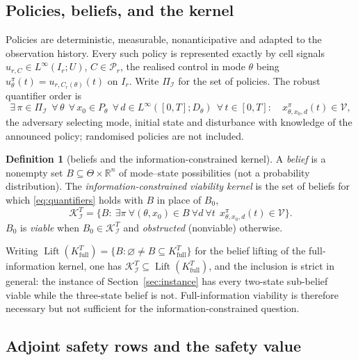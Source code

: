 \documentclass[11pt,a4paper]{article}
\theoremstyle{plain}
\theoremstyle{definition}
\newtheorem{definition}[theorem]{Definition}
\theoremstyle{remark}
\newcommand{\R}{\mathbb{R}}
\newcommand{\calI}{\mathcal{I}}
\newcommand{\calP}{\mathcal{P}}
\newcommand{\calV}{\mathcal{V}}
\newcommand{\calK}{\mathcal{K}}
\newcommand{\Pol}{\Pi_{\calI}}
\DeclareMathOperator{\Lift}{Lift}
\begin{document}
\subsection{Policies, beliefs, and the kernel}

Policies are deterministic, measurable, nonanticipative and adapted to the observation history. Every such policy is represented exactly by cell signals $u_{r,C}\in L^\infty(I_r;U)$, $C\in\calP_r$, the realised control in mode $\theta$ being $u^\pi_\theta(t)=u_{r,C_r(\theta)}(t)$ on $I_r$. Write $\Pol$ for the set of policies. The robust quantifier order is
\begin{equation}\label{eq:quantifiers}
\exists\,\pi\in\Pol\ \ \forall\,\theta\ \ \forall\,x_0\in P_\theta\ \ \forall\,d\in L^\infty([0,T];D_\theta)\ \ \forall\,t\in[0,T]:\quad x^\pi_{\theta,x_0,d}(t)\in\calV ,
\end{equation}
the adversary selecting mode, initial state and disturbance with knowledge of the announced policy; randomised policies are not included.

\begin{definition}[beliefs and the information-constrained kernel]\label{def:kernel}
A \emph{belief} is a nonempty set $B\subseteq\Theta\times\R^n$ of mode--state possibilities (not a probability distribution). The \emph{information-constrained viability kernel} is the set of beliefs for which \eqref{eq:quantifiers} holds with $B$ in place of $B_0$,
\[
\calK^T_\calI=\bigl\{B:\ \exists\pi\ \forall(\theta,x_0)\in B\ \forall d\ \forall t\ \ x^\pi_{\theta,x_0,d}(t)\in\calV\bigr\}.
\]
$B_0$ is \emph{viable} when $B_0\in\calK^T_\calI$ and \emph{obstructed} (nonviable) otherwise.
\end{definition}

Writing $\Lift(K^T_{\mathrm{full}})=\{B:\varnothing\ne B\subseteq K^T_{\mathrm{full}}\}$ for the belief lifting of the full-information kernel, one has $\calK^T_\calI\subseteq\Lift(K^T_{\mathrm{full}})$, and the inclusion is strict in general: the instance of Section~\ref{sec:instance} has every two-state sub-belief viable while the three-state belief is not. Full-information viability is therefore necessary but not sufficient for the information-constrained question.

\subsection{Adjoint safety rows and the safety value}
\end{document}
